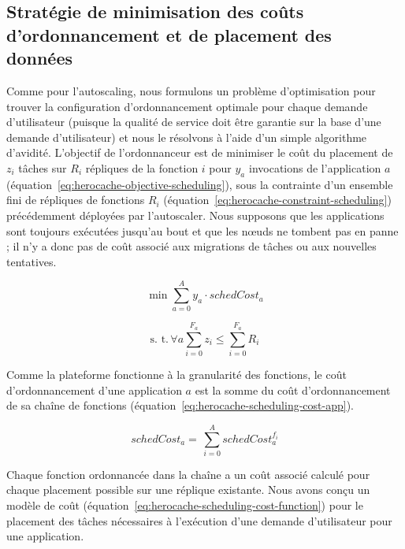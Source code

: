 \subsection{Stratégie de minimisation des coûts d'ordonnancement et de placement des données}

Comme pour l'autoscaling, nous formulons un problème d'optimisation pour trouver la configuration d'ordonnancement optimale pour chaque demande d'utilisateur (puisque la qualité de service doit être garantie sur la base d'une demande d'utilisateur) et nous le résolvons à l'aide d'un simple algorithme d'avidité. L'objectif de l'ordonnanceur est de minimiser le coût du placement de $z_i$ tâches sur $R_i$ répliques de la fonction $i$ pour $y_a$ invocations de l'application $a$ (équation~\ref{eq:herocache-objective-scheduling}), sous la contrainte d'un ensemble fini de répliques de fonctions $R_{i}$ (équation~\ref{eq:herocache-constraint-scheduling}) précédemment déployées par l'autoscaler. Nous supposons que les applications sont toujours exécutées jusqu'au bout et que les nœuds ne tombent pas en panne ; il n'y a donc pas de coût associé aux migrations de tâches ou aux nouvelles tentatives.

\begin{equation}
    \min \sum_{a = 0}^{A} y_a \cdot schedCost_{a}
\label{eq:herocache-objective-scheduling}
\end{equation}

\begin{equation}
    \text{s. t.} \, \forall a \sum_{i = 0}^{F_a} z_i \leq \sum_{i = 0}^{F_a} R_{i}
\label{eq:herocache-constraint-scheduling}
\end{equation}

Comme la plateforme fonctionne à la granularité des fonctions, le coût d'ordonnancement d'une application $a$ est la somme du coût d'ordonnancement de sa chaîne de fonctions (équation~\ref{eq:herocache-scheduling-cost-app}).

\begin{equation}
    schedCost_{a} = \, \sum_{i = 0}^{A} schedCost^{{{f}_{i}}}_{a}
\label{eq:herocache-scheduling-cost-app}
\end{equation}

Chaque fonction ordonnancée dans la chaîne a un coût associé calculé pour chaque placement possible sur une réplique existante.
Nous avons conçu un modèle de coût (équation~\ref{eq:herocache-scheduling-cost-function}) pour le placement des tâches nécessaires à l'exécution d'une demande d'utilisateur pour une application. 

